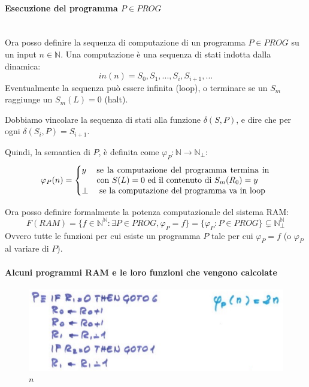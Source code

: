 \documentclass{article}
\begin{document}
\begin{itemize}
          \paragraph{Esecuzione del programma $P\in PROG$}\mbox{}\\
          Ora posso definire la sequenza di computazione di un programma $P\in PROG$ su un input $n\in\mathbb{N}$.
          Una computazione è una sequenza di stati indotta dalla dinamica:
          $$in(n)=S_0, S_1,...,S_i,S_{i+1},...$$
          Eventualmente la sequenza può essere infinita (loop), o terminare se un $S_m$
          raggiunge un $S_m(L)=0$ (halt).

          Dobbiamo vincolare la sequenza di stati alla funzione $\delta (S,P)$,
          e dire che per ogni $\delta(S_i,P)= S_{i+1}$.

          Quindi, la semantica di $P$, è definita come $\varphi_P:\mathbb{N}\rightarrow\mathbb{N}_\bot$:
          \[
              \varphi_P(n)=
              \begin{cases}
                  y    & \parbox[t]{.6\textwidth}{se la computazione del programma termina in con $S(L)=0$
                  ed il contenuto di $S_m(R_0)=y$}                                                        \\
                  \bot & \text{ se la computazione del programma va in loop}
              \end{cases}
          \]
\end{itemize}
Ora posso definire formalmente la potenza computazionale del sistema RAM:
$$F(RAM)=\{f\in\mathbb{N}^{\mathbb{N}}:\exists P\in PROG,\varphi_P = f\}=\{\varphi_P : P\in PROG\}\subsetneq\mathbb{N}^{\mathbb{N}}_{\bot}$$
Ovvero tutte le funzioni per cui esiste un programma $P$ tale per cui $\varphi_P = f$ (o $\varphi_P$ al variare di $P$).

\paragraph{Alcuni programmi RAM e le loro funzioni che vengono calcolate}\mbox{}
\begin{figure}[H]
    \centering
    \includegraphics[scale=0.5]{images/2n.png}
    \caption{$n$}
\end{figure}
\end{document}
